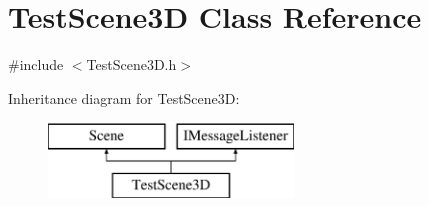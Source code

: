 \hypertarget{class_test_scene3_d}{}\section{Test\+Scene3D Class Reference}
\label{class_test_scene3_d}


{\ttfamily \#include $<$Test\+Scene3\+D.\+h$>$}

Inheritance diagram for Test\+Scene3D\+:\begin{figure}[H]
\begin{center}
\leavevmode
\includegraphics[height=2.000000cm]{class_test_scene3_d}
\end{center}
\end{figure}
